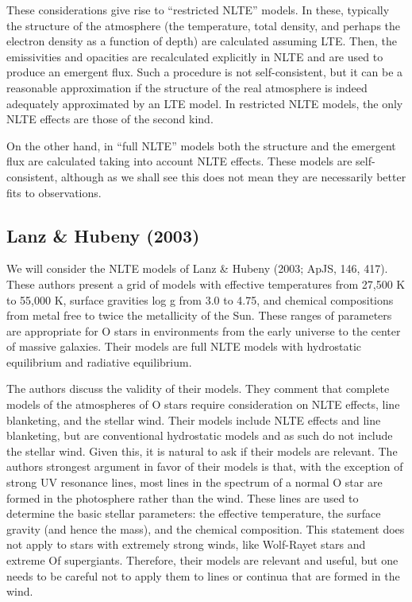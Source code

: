 These considerations give rise to “restricted NLTE” models. In these, typically the structure of the atmosphere (the temperature, total density, and perhaps the electron density as a function of depth) are calculated assuming LTE. Then, the emissivities and opacities are recalculated explicitly in NLTE and are used to produce an emergent flux. Such a procedure is not self-consistent, but it can be a reasonable approximation if the structure of the real atmosphere is indeed adequately approximated by an LTE model. In restricted NLTE models, the only NLTE effects are those of the second kind.

On the other hand, in “full NLTE” models both the structure and the emergent flux are calculated taking into account NLTE effects. These models are self-consistent, although as we shall see this does not mean they are necessarily better fits to observations.

\newslide

\subsection{Lanz \& Hubeny (2003)}

We will consider the NLTE models of Lanz \& Hubeny (2003; ApJS, 146, 417). These authors present a grid of models with effective temperatures from 27,500 K to 55,000 K, surface gravities log g from 3.0 to 4.75, and chemical compositions from metal free to twice the metallicity of the Sun. These ranges of parameters are appropriate for O stars in environments from the early universe to the center of massive galaxies. Their models are full NLTE models with hydrostatic equilibrium and radiative equilibrium.

The authors discuss the validity of their models. They comment that complete models of the atmospheres of O stars require consideration on NLTE effects, line blanketing, and the stellar wind. Their models include NLTE effects and line blanketing, but are conventional hydrostatic models and as such do not include the stellar wind. Given this, it is natural to ask if their models are relevant. The authors strongest argument in favor of their models is that, with the exception of strong UV resonance lines, most lines in the spectrum of a normal O star are formed in the photosphere rather than the wind. These lines are used to determine the basic stellar parameters: the effective temperature, the surface gravity (and hence the mass), and the chemical composition. This statement does not apply to stars with extremely strong winds, like Wolf-Rayet stars and extreme Of supergiants. Therefore, their models are relevant and useful, but one needs to be careful not to apply them to lines or continua that are formed in the wind.


